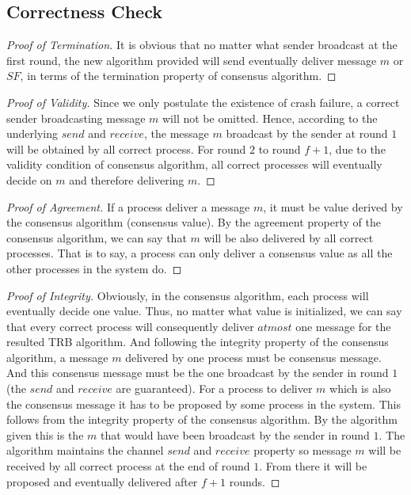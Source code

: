 \documentclass[11pt,a4paper]{article}
\begin{document}
\newpage
\subsection{Correctness Check}
\begin{proof}[Proof of Termination]
    It is obvious that no matter what sender broadcast at the first round, the
    new algorithm provided will send eventually deliver message $m$ or $SF$,
    in terms of the termination property of consensus algorithm.
\end{proof}
\begin{proof}[Proof of Validity]
Since we only postulate the existence of crash failure, a correct sender
broadcasting message $m$ will not be omitted. Hence, according to the
underlying $send$ and $receive$, the message $m$ broadcast by the sender at
 round $1$ will be obtained by all correct process. 
For round $2$ to round $f+1$, due to the validity condition of consensus
algorithm, all correct processes will eventually decide on $m$ and therefore delivering $m$.
\end{proof}
\begin{proof}[Proof of Agreement]
If a process deliver a message $m$, it must be value derived by the consensus
algorithm (consensus value). By the agreement 
property of the consensus algorithm, we can say that $m$ will be also
delivered by all correct processes. That is to say, a process can only deliver
a consensus value as all the other processes in the system do.
\end{proof}

\begin{proof}[Proof of Integrity]
Obviously, in the consensus algorithm, each process will eventually decide one
value.  Thus, no matter what value is initialized, we can say that every
correct process will consequently deliver $at most$ one message for the
resulted TRB algorithm.
%
And following the integrity property of the consensus algorithm, a message $m$
delivered by one process must be consensus message. And this consensus message
must be the one broadcast by the sender in round $1$ (the $send$ and
$receive$ are guaranteed).
For a process to deliver $m$ which is also the consensus message it has to be
proposed by some process in the system. This follows from the integrity
property of the consensus algorithm. By the algorithm given this is the $m$
that would have been broadcast by the sender in round $1$. The algorithm
maintains the channel $send$ and $receive$ property so message $m$ will be
received by all correct process at the end of round $1$. From there it will be
proposed and eventually delivered after $f+1$ rounds.
\end{proof}
\newpage
\end{document}
